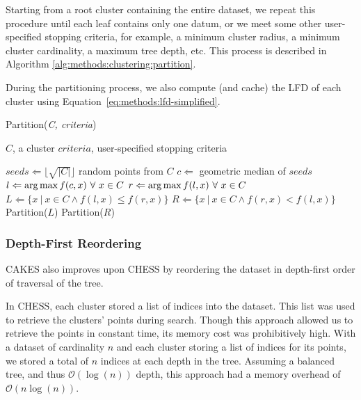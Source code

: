 Starting from a root cluster containing the entire dataset, we repeat this procedure until each leaf contains only one datum, or we meet some other user-specified stopping criteria, for example, a minimum cluster radius, a minimum cluster cardinality, a maximum tree depth, etc.
This process is described in Algorithm \ref{alg:methods:clustering:partition}.

During the partitioning process, we also compute (and cache) the LFD of each cluster using Equation~\ref{eq:methods:lfd-simplified}.

\begin{algorithm} %
    \caption{Partition(\emph{C, criteria})} %
    \label{alg:methods:clustering:partition} %
    \begin{algorithmic} %
        \REQUIRE $C$, a cluster
        \REQUIRE $criteria$, user-specified stopping criteria

        \STATE $seeds \Leftarrow \lfloor \sqrt{|C|} \rfloor$ random points from $C$
        \STATE $c \Leftarrow$ geometric median of $seeds$
        \STATE $l \Leftarrow \operatorname*{arg\,max} f(c, x) \ \forall \ x \in C$
        \STATE $r \Leftarrow \argmax f(l, x) \ \forall \ x \in C$
        \STATE $L \Leftarrow \{x \ | \ x \in C \land f(l, x) \le f(r, x)\}$
        \STATE $R \Leftarrow \{x \ | \ x \in C \land f(r, x) < f(l, x)\}$
            \STATE Partition($L$)
        \ENDIF
            \STATE Partition($R$)
        \ENDIF
    \end{algorithmic}
\end{algorithm}


\subsubsection {Depth-First Reordering}
\label{subsubsec:methods:clustering:dataset-depth-first-reordering}

CAKES also improves upon CHESS by reordering the dataset in depth-first order of traversal of the tree.

In CHESS, each cluster stored a list of indices into the dataset.
This list was used to retrieve the clusters' points during search.
Though this approach allowed us to retrieve the points in constant time, its memory cost was prohibitively high.
With a dataset of cardinality $n$ and each cluster storing a list of indices for its points, we stored a total of $n$ indices at each depth in the tree.
Assuming a balanced tree, and thus $\mathcal{O}(\log(n))$ depth, this approach had a memory overhead of $\mathcal{O}(n\log(n))$.

